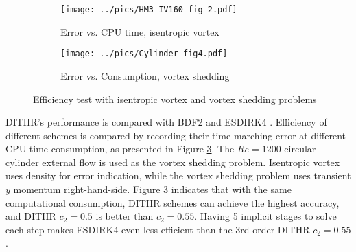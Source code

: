 \documentclass[10pt]{article}
\begin{document}
\begin{figure}[htbp]
  \centering
  \begin{subfigure}{0.4\textwidth}
    \texttt{[image: ../pics/HM3\_IV160\_fig\_2.pdf]}
    \caption[]{Error vs. CPU time, isentropic vortex}
    \label{sfig:IVTests_Eff}
  \end{subfigure}\hfill
  \begin{subfigure}{0.4\textwidth}
    \texttt{[image: ../pics/Cylinder\_fig4.pdf]}
    \caption[]{Error vs. Consumption, vortex shedding}
    \label{sfig:CyTests_Eff}
  \end{subfigure}
  \caption[]{Efficiency test with isentropic vortex and vortex shedding problems}
  \label{fig:IVTests}
\end{figure}

DITHR's performance is compared with BDF2 and ESDIRK4 \cite{kennedy2003additiveARK}.
Efficiency of different schemes is compared by 
recording their time marching error at different CPU time consumption,
as presented in Figure \ref{fig:IVTests}. 
The $Re=1200$ 
circular cylinder external flow is used as the vortex shedding problem.
Isentropic vortex uses density for error indication, while the 
vortex shedding problem uses transient $y$ momentum right-hand-side.
Figure \ref{fig:IVTests} indicates that with the same computational 
consumption, DITHR schemes can achieve the highest accuracy, 
and DITHR $c_2=0.5$ is better than $c_2=0.55$.
Having 5 implicit stages to solve each step makes ESDIRK4 even less efficient than 
the 3rd order DITHR $c_2=0.55$.
\end{document}
